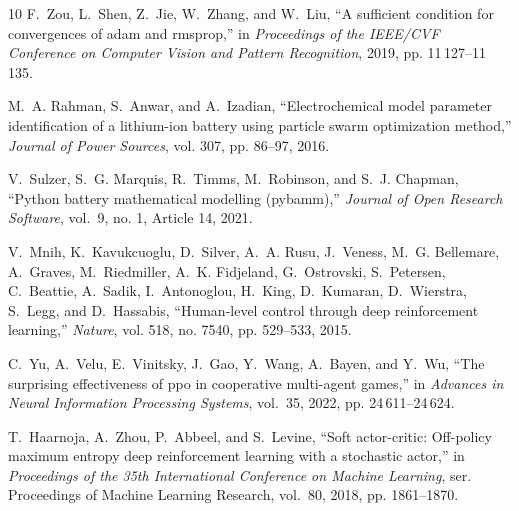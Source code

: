 \documentclass[10pt,journal,letterpaper]{IEEEtran}
\begin{document}
\begin{thebibliography}{10}
F.~Zou, L.~Shen, Z.~Jie, W.~Zhang, and W.~Liu, ``A sufficient condition for
  convergences of adam and rmsprop,'' in \emph{Proceedings of the IEEE/CVF
  Conference on Computer Vision and Pattern Recognition}, 2019, pp.
  11\,127--11\,135.

M.~A. Rahman, S.~Anwar, and A.~Izadian, ``Electrochemical model parameter
  identification of a lithium-ion battery using particle swarm optimization
  method,'' \emph{Journal of Power Sources}, vol. 307, pp. 86--97, 2016.

V.~Sulzer, S.~G. Marquis, R.~Timms, M.~Robinson, and S.~J. Chapman, ``Python
  battery mathematical modelling (pybamm),'' \emph{Journal of Open Research
  Software}, vol.~9, no. 1, Article 14, 2021.

V.~Mnih, K.~Kavukcuoglu, D.~Silver, A.~A. Rusu, J.~Veness, M.~G. Bellemare,
  A.~Graves, M.~Riedmiller, A.~K. Fidjeland, G.~Ostrovski, S.~Petersen,
  C.~Beattie, A.~Sadik, I.~Antonoglou, H.~King, D.~Kumaran, D.~Wierstra,
  S.~Legg, and D.~Hassabis, ``Human-level control through deep reinforcement
  learning,'' \emph{Nature}, vol. 518, no. 7540, pp. 529--533, 2015.

C.~Yu, A.~Velu, E.~Vinitsky, J.~Gao, Y.~Wang, A.~Bayen, and Y.~Wu, ``The
  surprising effectiveness of ppo in cooperative multi-agent games,'' in
  \emph{Advances in Neural Information Processing Systems}, vol.~35, 2022, pp.
  24\,611--24\,624.

T.~Haarnoja, A.~Zhou, P.~Abbeel, and S.~Levine, ``Soft actor-critic: Off-policy
  maximum entropy deep reinforcement learning with a stochastic actor,'' in
  \emph{Proceedings of the 35th International Conference on Machine Learning},
  ser. Proceedings of Machine Learning Research, vol.~80, 2018, pp. 1861--1870.

\end{thebibliography}
\end{document}
